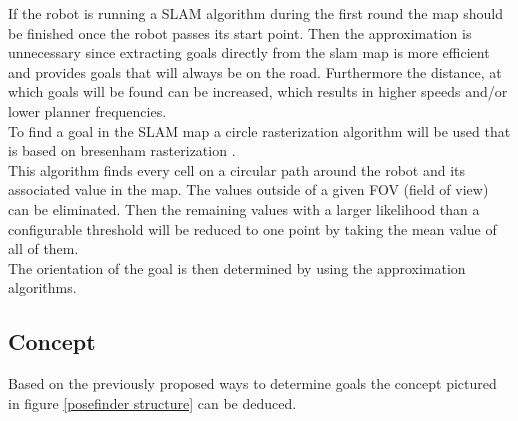 If the robot is running a SLAM algorithm during the first round the map should be finished once the robot passes its start point. Then the approximation is unnecessary since extracting goals directly from the slam map is more efficient and provides goals that will  always be on the road. Furthermore the distance, at which goals will be found can be increased, which results in higher speeds and/or lower planner frequencies.\\

To find a goal in the SLAM map a circle rasterization algorithm will be used that is based on bresenham rasterization \cite{ComputerGraphics}.\\

This algorithm finds every cell on a circular path around the robot and its associated value in the map. The values outside of a given FOV (field of view) can be eliminated. Then the remaining values with a larger likelihood than a configurable threshold will be reduced to one point by taking the mean value of all of them.\\

The orientation of the goal is then determined by using the approximation algorithms.

\subsection{Concept}

Based on the previously proposed ways to determine goals the concept pictured in figure \ref{posefinder structure} can be deduced.\\

